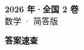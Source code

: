 \documentclass[zihao=-4, a4paper]{ctexart}
\begin{document}
\begin{center}
  {\Large\bfseries 2026 年·全国 2 卷}\\[4pt]
  {\large 数学 · 简答版}
\end{center}
\medskip
{}

\clearpage
{}
\begin{center}{\Large\bfseries 答案速查}\end{center}
\medskip

\end{document}
